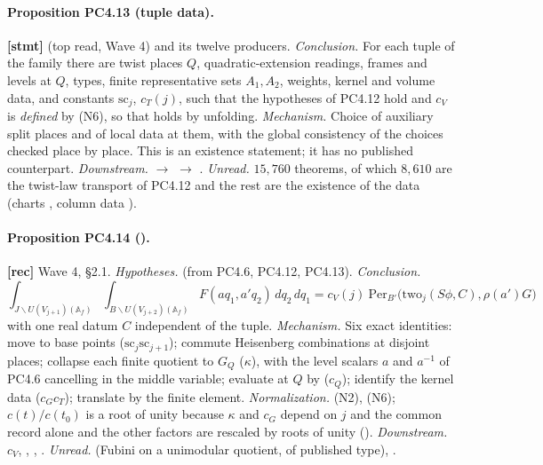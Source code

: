 \documentclass[11pt]{article}
\begin{document}
\paragraph{Proposition PC4.13 (tuple data).} \textbf{[stmt]}  (top read, Wave 4) and its twelve  producers.
\emph{Conclusion.} For each tuple of the family there are twist places $Q$, quadratic-extension readings, frames and levels at $Q$, types, finite representative sets $A_1,A_2$, weights, kernel and volume data, and constants $\mathrm{sc}_j$, $c_T(j)$, such that the hypotheses of PC4.12 hold and $c_V$ is \emph{defined} by (N6), so that  holds by unfolding. \emph{Mechanism.} Choice of auxiliary split places and of local data at them, with the global consistency of the choices checked place by place. This is an existence statement; it has no published counterpart. \emph{Downstream.}  $\to$  $\to$ . \emph{Unread.} $15{,}760$ theorems, of which $8{,}610$ are the twist-law transport of PC4.12 and the rest are the existence of the data (charts , column data ).

\paragraph{Proposition PC4.14 ().} \textbf{[rec]} Wave 4, \S2.1.
\emph{Hypotheses.}  (from PC4.6, PC4.12, PC4.13). \emph{Conclusion.}
\[
\int_{J\backslash U(V_{j+1})(\mathbb A_f)}\int_{B\backslash U(V_{j+2})(\mathbb A_f)}F(aq_1,a'q_2)\,dq_2\,dq_1=c_V(j)\ \mathrm{Per}_{B'}\bigl(\mathrm{two}_j(S\phi,C),\rho(a')G\bigr)
\]
with one real datum $C$ independent of the tuple. \emph{Mechanism.} Six exact identities: move to base points ($\mathrm{sc}_j\mathrm{sc}_{j+1}$); commute Heisenberg combinations at disjoint places; collapse each finite quotient to $G_Q$ ($\kappa$), with the level scalars $a$ and $a^{-1}$ of PC4.6 cancelling in the middle variable; evaluate at $Q$ by  ($c_Q$); identify the kernel data ($c_Gc_T$); translate by the finite element. \emph{Normalization.} (N2), (N6); $c(t)/c(t_0)$ is a root of unity because $\kappa$ and $c_G$ depend on $j$ and the common record alone and the other factors are rescaled by roots of unity (). \emph{Downstream.} $c_V$, , , . \emph{Unread.}  (Fubini on a unimodular quotient, of published type), .
\end{document}
